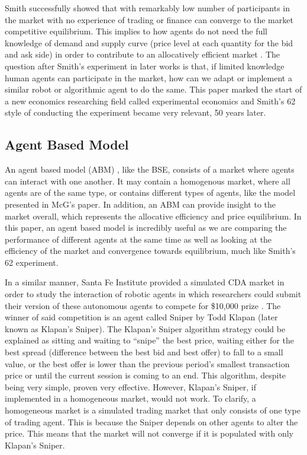 \documentclass{article}
\begin{document}
Smith successfully showed that with remarkably low number of participants in the market with no experience of trading or finance can converge to the market competitive equilibrium. This implies to how agents do not need the full knowledge of demand and supply curve (price level at each quantity for the bid and ask side) in order to contribute to an allocatively efficient market \cite{smith1962}. The question after Smith’s experiment in later works is that, if limited knowledge human agents can participate in the market, how can we adapt or implement a similar robot or algorithmic agent to do the same. This paper marked the start of a new economics researching field called experimental economics and Smith’s 62 style of conducting the experiment became very relevant, 50 years later.

\subsection{Agent Based Model}
An agent based model (ABM) , like the BSE, consists of a market where agents can interact with one another. It may contain a homogenous market, where all agents are of the same type, or contains different types of agents, like the model presented in McG's paper. In addition, an ABM can provide insight to the market overall, which represents the allocative efficiency and price equilibrium. In this paper, an agent based model is incredibly useful as we are comparing the performance of different agents at the same time as well as looking at the efficiency of the market and convergence towards equilibrium, much like Smith’s 62 experiment.

In a similar manner, Santa Fe Institute provided a simulated CDA market in order to study the interaction of robotic agents in which researchers could submit their version of these autonomous agents to compete for \$10,000 prize \cite{Santafe}. The winner of said competition is an agent called Sniper by Todd Klapan (later known as Klapan’s Sniper). The Klapan’s Sniper algorithm strategy could be explained as sitting and waiting to “snipe” the best price, waiting either for the best spread (difference between the best bid and best offer) to fall to a small value, or the best offer is lower than the previous period’s smallest transaction price or until the current session is coming to an end. This algorithm, despite being very simple, proven very effective. However, Klapan’s Sniper, if implemented in a  homogeneous market, would not work. To clarify, a homogeneous market is a simulated trading market that only consists of one type of trading agent. This is because the Sniper depends on other agents to alter the price. This means that the market will not converge if it is populated with only Klapan’s Sniper. 
\end{document}
